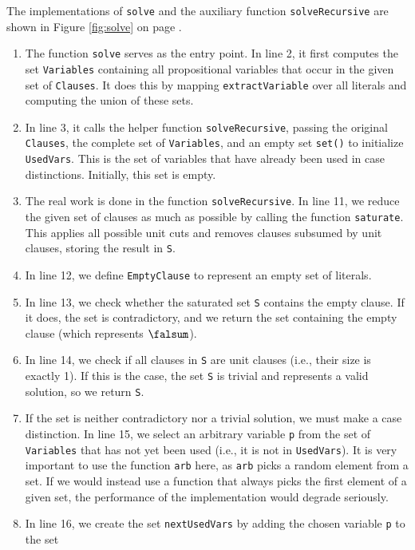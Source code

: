 The implementations of \texttt{solve} and the auxiliary function \texttt{solveRecursive} are shown in Figure
\ref{fig:solve} on page \pageref{fig:solve}.
\begin{enumerate}
\item The function \texttt{solve} serves as the entry point. In line 2, it first computes the set
  \texttt{Variables} containing all propositional variables that occur in the given set of \texttt{Clauses}. It
  does this by mapping \texttt{extractVariable} over all literals and computing the union of these sets. 
\item In line 3, it calls the helper function \texttt{solveRecursive}, passing the original \texttt{Clauses},
  the complete set of \texttt{Variables}, and an empty set \texttt{set()} to initialize \texttt{UsedVars}.
  This is the set of variables that have already been used in case distinctions.  Initially, this set is empty.
\item The real work is done in the function \texttt{solveRecursive}. In line 11, we reduce the given set of
  clauses as much as possible by calling the function \texttt{saturate}. This applies all possible unit cuts
  and removes clauses subsumed by unit clauses, storing the result in \texttt{S}. 
\item In line 12, we define \texttt{EmptyClause} to represent an empty set of literals.
\item In line 13, we check whether the saturated set \texttt{S} contains the empty clause. If it does, the set
  is contradictory, and we return the set containing the empty clause (which represents $\falsum$). 
\item In line 14, we check if all clauses in \texttt{S} are unit clauses (i.e., their size is exactly 1). If
  this is the case, the set \texttt{S} is trivial and represents a valid solution, so we return \texttt{S}. 
\item If the set is neither contradictory nor a trivial solution, we must make a case distinction. In line 15,
  we select an arbitrary variable \texttt{p} from the set of \texttt{Variables} that has not yet been used
  (i.e., it is not in \texttt{UsedVars}).  It is very important to use the function \texttt{arb} here, as
  \texttt{arb} picks a random element from a set.  If we would instead use a function that always picks the
  first element of a given set, the performance of the implementation would degrade seriously.
\item In line 16, we create the set \texttt{nextUsedVars} by adding the chosen variable \texttt{p} to the set

\end{enumerate}
